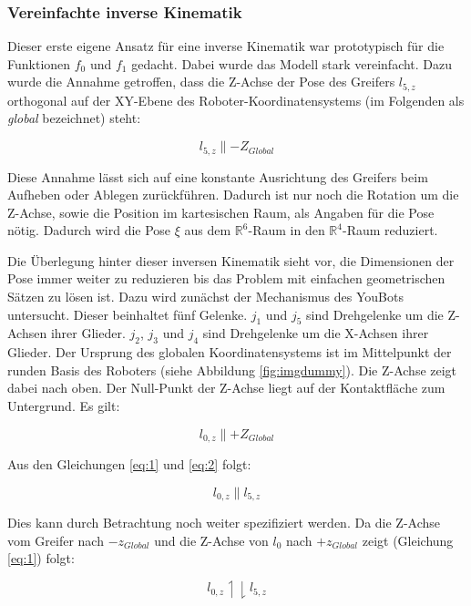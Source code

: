 \subsubsection{Vereinfachte inverse Kinematik}
Dieser erste eigene Ansatz für eine inverse Kinematik war prototypisch für die Funktionen $f_0$ und $f_1$ gedacht. Dabei wurde das Modell stark vereinfacht. Dazu wurde die Annahme getroffen, dass die Z-Achse der Pose des Greifers $l_{5,z}$ orthogonal auf der XY-Ebene des Roboter-Koordinatensystems (im Folgenden als \textit{global} bezeichnet) steht:

\begin{equation}
l_{5,z} \parallel -Z_{Global}
\label{eq:1}
\end{equation}


Diese Annahme lässt sich auf eine konstante Ausrichtung des Greifers beim Aufheben oder Ablegen zurückführen. Dadurch ist nur noch die Rotation um die Z-Achse, sowie die Position im kartesischen Raum, als Angaben für die Pose nötig. Dadurch wird die Pose $\xi$ aus dem $ \mathbb{R}^6 $-Raum in den $ \mathbb{R}^4 $-Raum reduziert.

Die Überlegung hinter dieser inversen Kinematik sieht vor, die Dimensionen der Pose immer weiter zu reduzieren bis das Problem mit einfachen geometrischen Sätzen zu lösen ist. Dazu wird zunächst der Mechanismus des YouBots untersucht. Dieser beinhaltet fünf Gelenke. $j_1$ und $j_5$ sind Drehgelenke um die Z-Achsen ihrer Glieder. $j_2$, $j_3$ und $j_4$ sind Drehgelenke um die X-Achsen ihrer Glieder. Der Ursprung des globalen Koordinatensystems ist im Mittelpunkt der runden Basis des Roboters (siehe Abbildung \ref{fig:imgdummy}). Die Z-Achse zeigt dabei nach oben. Der Null-Punkt der Z-Achse liegt auf der Kontaktfläche zum Untergrund. Es gilt:

\begin{equation}
l_{0,z} \parallel +Z_{Global}
\label{eq:2}
\end{equation}

Aus den Gleichungen \ref{eq:1} und \ref{eq:2} folgt:

\begin{equation}
l_{0,z} \parallel l_{5,z}
\label{eq:3}
\end{equation}

Dies kann durch Betrachtung noch weiter spezifiziert werden. Da die Z-Achse vom Greifer nach $-z_{Global}$ und die Z-Achse von $l_0$ nach $+z_{Global}$  zeigt (Gleichung \ref{eq:1}) folgt:

\begin{equation}
l_{0,z} \upharpoonleft \downharpoonright l_{5,z}
\label{eq:4}
\end{equation}

